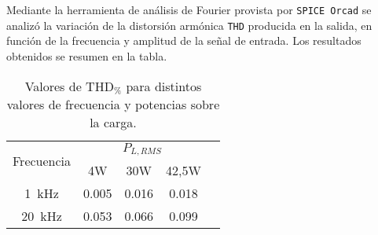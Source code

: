 	Mediante la herramienta de análisis de Fourier provista por \texttt{SPICE Orcad} se analizó la variación de la distorsión armónica \texttt{THD} producida en la salida, en función de la frecuencia y amplitud de la señal de entrada. Los resultados obtenidos se resumen en la tabla.

\begin{table}[H]
	\centering
	\begin{tabular}{ccccc}
		\toprule
\multirow{2}{*}{Frecuencia} & \multicolumn{3}{c}{$P_{L,RMS}$} \\ 
		\cmidrule{2-4}
			& 4W & 30W & 42,5W \\
		\midrule
		\SI{1}{\kHz} & \num{0,005} & \num{0,016} & \num{0,018} \\
		\SI{20}{\kHz} & \num{0.053} & \num{0,066} & \num{0,099} \\
		\bottomrule
	\end{tabular}
	\caption{Valores de $\mathrm{THD}_{\%}$ para distintos valores de frecuencia y potencias sobre la carga.}
\end{table}


%
%
%
%
%





